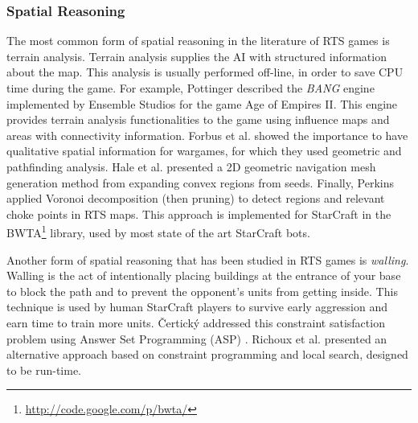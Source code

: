 \documentclass{llncs}
\begin{document}
\subsubsection{Spatial Reasoning}
The most common form of spatial reasoning in the literature of RTS games is terrain analysis.
Terrain analysis supplies  the AI
with structured information  about the map.  This  analysis is usually
performed off-line,  in order to  save CPU  time during the  game. For
example, Pottinger \cite{Pottinger00} described the \emph{BANG} engine
implemented by Ensemble  Studios for the game Age of  Empires II. This
engine  provides terrain  analysis functionalities  to the  game using
influence maps and areas with connectivity information.  Forbus et al.
\cite{Forbus2002} showed  the importance  to have  qualitative spatial
information  for   wargames,  for   which  they  used   geometric  and
pathfinding  analysis.   Hale  et  al. \cite{Hale08}  presented  a  2D
geometric  navigation mesh  generation  method  from expanding  convex
regions from seeds.  Finally, Perkins \cite{Perkins10} applied Voronoi
decomposition (then pruning) %
to detect regions and relevant choke points in RTS maps. This approach
is        implemented        for        StarCraft        in        the
BWTA\footnote{\url{http://code.google.com/p/bwta/}}  library, used  by
most state of the art StarCraft bots.

Another form of spatial reasoning that has been studied in RTS games is {\em walling}. Walling is the act of  intentionally placing buildings at the entrance
of your  base to block  the path and  to prevent the  opponent's units
from getting inside. This technique is used by human StarCraft players
to   survive  early   aggression   and  earn   time   to  train   more
units.  \v{C}ertick\'{y} addressed  this constraint  satisfaction problem
using Answer Set Programming (ASP) \cite{certicky2013wallin}. Richoux et al. \cite{richoux2014walling} presented an alternative approach based on constraint programming and local search, designed to be run-time.

\end{document}
